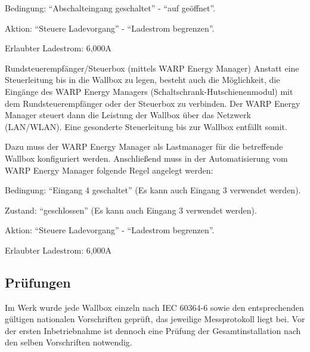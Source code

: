 \documentclass[a4paper,10pt]{article}
\begin{document}
\begin{multicols*}{2}
\begin{description}
        \begin{description}
            \item{Bedingung:} \enquote{Abschalteingang geschaltet} - \enquote{auf geöffnet}.
            \item{Aktion:} \enquote{Steuere Ladevorgang} - \enquote{Ladestrom begrenzen}.
            \item{Erlaubter Ladestrom:} 6,000A
        \end{description}

        \item{Rundsteuerempfänger/Steuerbox (mittels WARP Energy Manager)}
        Anstatt eine Steuerleitung bis in die Wallbox zu legen, besteht auch die
        Möglichkeit, die Eingänge des WARP Energy Managers
        (Schaltschrank-Hutschienenmodul) mit dem Rundsteuerempfänger oder der
        Steuerbox zu verbinden. Der WARP Energy Manager steuert dann die
        Leistung der Wallbox über das Netzwerk (LAN/WLAN). Eine gesonderte
        Steuerleitung bis zur Wallbox entfällt somit.

        Dazu muss der WARP Energy Manager als Lastmanager für die betreffende
        Wallbox konfiguriert werden. Anschließend muss in der Automatisierung
        vom WARP Energy Manager folgende Regel angelegt werden:

        \begin{description}
            \item{Bedingung:} \enquote{Eingang 4 geschaltet} (Es kann auch Eingang 3 verwendet werden).
            \item{Zustand:} \enquote{geschlossen} (Es kann auch Eingang 3 verwendet werden).
            \item{Aktion:} \enquote{Steuere Ladevorgang} - \enquote{Ladestrom begrenzen}.
            \item{Erlaubter Ladestrom:} 6,000A
        \end{description}
    \end{description}


    \newpage
    \subsection{Prüfungen}\label{tests}
    Im Werk wurde jede Wallbox einzeln nach IEC 60364-6 sowie den entsprechenden gültigen
    nationalen Vorschriften geprüft, das jeweilige Messprotokoll liegt bei.
    Vor der ersten Inbetriebnahme ist dennoch eine Prüfung der Gesamtinstallation
    nach den selben Vorschriften notwendig.


\end{multicols*}
\end{document}
